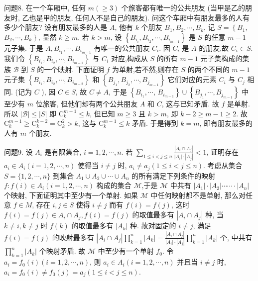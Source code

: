 问题8. 在一个车厢中, 任何 $m(\geqslant 3)$ 个旅客都有唯一的公共朋友 (当甲是乙的朋友时, 乙也是甲的朋友, 任何人不是自己的朋友). 问这个车厢中有朋友最多的人有多少个朋友?
设有朋友最多的人是 $A$, 他有 $k$ 个朋友 $B_1, B_2, \cdots, B_k$, 记 $S=\left\{B_1\right.$, $\left.B_2, \cdots, B_k\right\}$, 显然 $k \geqslant m$. 若 $k>m$, 设 $\left\{B_{i_i}, B_{i_2}, \cdots, B_{i_{m-1}}\right\}$ 是 $S$ 的任意 $m-1$ 元子集.
于是 $A, B_{i_1}, \cdots, B_{i_{m-1}}$ 有唯一的公共朋友 $C_i$. 因 $C_i$ 是 $A$ 的朋友,故 $C_i \in S$. 我们令 $\left\{B_{i_1}, B_{i_2}, \cdots, B_{i_{m-1}}\right\}$ 与 $C_i$ 对应,构成从 $S$ 的所有 $m-1$ 元子集构成的集族 $\mathscr{B}$ 到 $S$ 的一个映射.
下面证明 $f$ 为单射,若不然,则存在 $S$ 的两个不同的 $m-1$ 元子集 $\left\{B_{i_1}, B_{i_2}, \cdots, B_{i_{m-2}}\right\}$ 和 $\left\{B_{j_1}, B_{j_2}, \cdots, B_{j_{m-1}}\right\}$ 它们对应的元素 $C_i$ 与 $C_j$ 相同.
(记为 $C$ ), 因 $C \in S$, 故 $C \neq A$, 于是 $\left\{B_{i_1}, \cdots\right.$, $\left.B_{i_{m-1}}\right\} \cup\left\{B_{j_1}, \cdots, B_{j_{m-1}}\right\}$ 中至少有 $m$ 位旅客, 但他们却有两个公共朋友 $A$ 和 $C$, 这与已知矛盾.
故 $f$ 是单射.
所以 $|\mathscr{B}| \leqslant|S|$ 即 $\mathrm{C}_k^{m-1} \leqslant k$, 但已知 $m \geqslant 3$ 且 $k>m$, 即 $k-2 \geqslant m-1 \geqslant 2$. 故 $\mathrm{C}_k^{m-1} \geqslant \mathrm{C}_k^{k-2}=\mathrm{C}_k^2>k$, 这与 $\mathrm{C}_k^{m-1} \leqslant k$ 矛盾.
于是得到 $k=m$, 即有朋友最多的人有 $m$ 个朋友.



问题9. 设 $A_i$ 是有限集合, $i=1,2, \cdots, n$. 若 $\sum_{1 \leqslant i<j \leqslant n} \frac{\left|A_i \cap A_j\right|}{\left|A_i\right| \cdot\left|A_j\right|}<1$, 证明存在 $a_i \in A_i(i=1,2, \cdots, n)$ 使得当 $i \neq j$ 时, $a_i \neq a_j(1 \leqslant i<j \leqslant n)$.
考虑从集合 $S=\{1,2, \cdots, n\}$ 到集合 $A_1 \cup A_2 \cup \cdots \cup A_n$ 的所有满足下列条件的映射 $f: f(i) \in A_i(i=1,2, \cdots, n)$ 构成的集合 $\mathscr{M}$,于是 $\mathscr{M}$ 中共有 $\left|A_1\right| \cdot\left|A_2\right| \cdots \cdots \cdot\left|A_n\right|$ 个映射, 下面证明其中至少有一个单射.
如果 $\mathscr{M}$ 中任何映射都不是单射, 那么对任意 $f \in M$, 存在 $i, j \in S$ 使得 $i \neq j$ 而有 $f(i)= f(j)$, 这时 $f(i)=f(j) \in A_i \cap A_j, f(i)=f(j)$ 的取值最多有 $\left|A_i \cap A_j\right|$ 种, 当 $k \neq i, k \neq j$ 时 $f(k)$ 的取值最多有 $\left|A_k\right|$ 种.
故对固定的 $i \neq j$, 满足 $f(i)=f(j)$ 的映射最多有 $\left|A_i \cap A_j\right| \prod_{k=1}^n\left|A_k\right|=\frac{\left|A_i \cap A_j\right|}{\left|A_i\right| \cdot\left|A_j\right|} \prod_{k=1}^n\left|A_k\right|$ 个, 中共有 $\prod_{k=1}^n\left|A_k\right|$ 个映射矛盾.
故 $\mathscr{M}$ 中至少有一个单射 $f_0$. 令 $a_i=f_0(i)(i= 1,2, \cdots, n)$, 则 $a_i \in A_i(i=1,2, \cdots, n)$ 并且当 $i \neq j$ 时, $a_i=f_0(i) \neq f_0(j)=a_j(1 \leqslant i<j \leqslant n)$.



